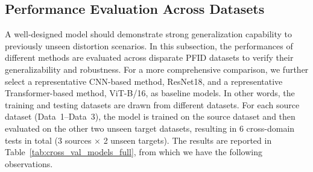 \documentclass[review]{elsarticle}
\begin{document}
\subsection{Performance Evaluation Across Datasets}
A well-designed model should demonstrate strong generalization capability to previously unseen distortion scenarios. In this subsection, the performances of different methods are evaluated across disparate PFID datasets to verify their generalizability and robustness. For a more comprehensive comparison, we further select a representative CNN-based method, ResNet18, and a representative Transformer-based method, ViT-B/16, as baseline models. In other words, the training and testing datasets are drawn from different datasets. For each source dataset (Data~1--Data~3), the model is trained on the source dataset and then evaluated on the other two unseen target datasets, resulting in 6 cross-domain tests in total (3 sources $\times$ 2 unseen targets). The results are reported in Table~\ref{tab:cross_val_models_full}, from which we have the following observations.

\begin{table}[!htbp]
\centering
\caption{Cross-dataset generalization results. The average accuracy (Avg) and standard deviation (Std) are computed across all six full cross-domain validation tasks. Bold indicates the best performance. $\uparrow$ indicates higher is better, and $\downarrow$ indicates lower is better.}
\renewcommand{\arraystretch}{1.15}

\label{tab:cross_val_models_full}
\end{table}
\end{document}
